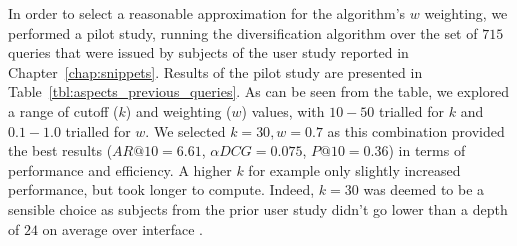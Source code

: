 In order to select a reasonable approximation for the algorithm's $w$ weighting, we performed a pilot study, running the diversification algorithm over the set of $715$ queries that were issued by subjects of the user study reported in Chapter~\ref{chap:snippets}. Results of the pilot study are presented in Table~\ref{tbl:aspects_previous_queries}. As can be seen from the table, we explored a range of cutoff ($k$) and weighting ($w$) values, with $10-50$ trialled for $k$ and $0.1-1.0$ trialled for $w$. We selected $k=30, w=0.7$ as this combination provided the best results ($AR@10=6.61$, $\alpha DCG=0.075$, $P@10=0.36$) in terms of performance and efficiency. A higher $k$ for example only slightly increased performance, but took longer to compute. Indeed, $k=30$ was deemed to be a sensible choice as subjects from the prior user study didn't go lower than a depth of $24$ on average over interface .


